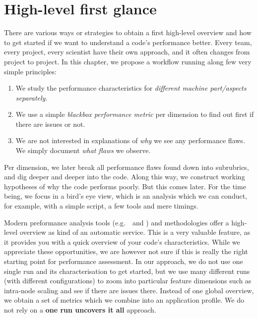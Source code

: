 \chapter{High-level first glance}
\label{chapter:high-level}


There are various ways or strategies to obtain a first high-level overview and how to get started if we want to understand a code's performance better.
Every team, every project, every scientist have their own approach, and it often changes from project to project.
In this chapter, we propose a workflow running along few very simple principles:

\begin{enumerate}
  \item We study the performance characteristics for \emph{different machine part/aspects separately}. 
  \item We use a simple \emph{blackbox performance metric} per dimension to find out first if there are issues or not.
  \item We are not interested in explanations of \emph{why} we see any performance flaws. We simply document \emph{what flaws} we observe.
\end{enumerate}


\noindent
Per dimension, we later break all performance flaws found down into subrubrics, and dig deeper and deeper into the code.
Along this way, we construct working hypotheses of why the code performs poorly.
But this comes later.
For the time being, we focus in a bird's eye view, which is an analysis which we
can conduct, for example, with a simple script, a few tools and
mere timings.


\begin{assessmentcrime}
  Modern preformance analysis tools (e.g.~\aps~and \map) and methodologies offer a high-level overview as kind of an automatic service.
  This is a very valuable feature, as it provides you with a quick overview of your code's characteristics.
  While we appreciate these opportunities, we are however not sure if this is really the right starting point for performance assessment.
  In our approach, we do not use one single run and its characterisation to get started, but we use many different runs (with different configurations) to zoom into particular feature dimensions such as intra-node scaling and see if there are issues there.
  Instead of one global overview, we obtain a set of metrics which we combine into an application profile. 
  We do not rely on a {\bf one run uncovers it all} approach.
\end{assessmentcrime}

